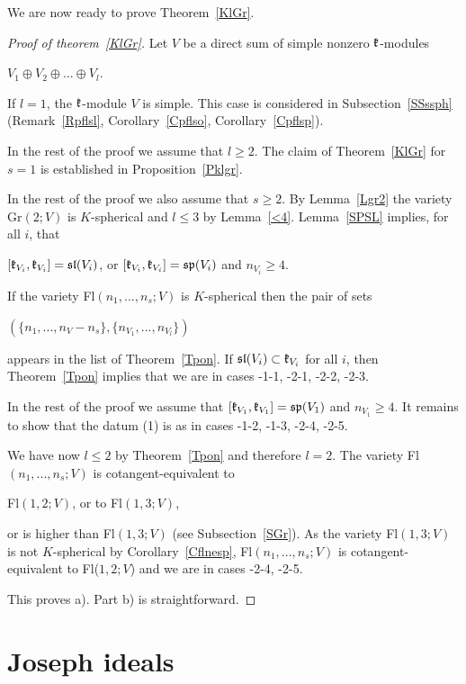 \documentclass[12pt]{amsart}
\theoremstyle{definition}\newtheorem{theorem}{Theorem}[section]
\theoremstyle{definition}\newtheorem{definition}[proposition]{Definition}
\theoremstyle{remark}\newtheorem{example}[proposition]{Example}
\newcounter{AP}
\begin{document}
We are now ready to prove Theorem~\ref{KlGr}.
\begin{proof}[Proof of theorem~\ref{KlGr}]Let $V$ be a direct sum of simple nonzero $\frak k$-modules \begin{center}$V_1\oplus V_2\oplus... \oplus V_l$.\end{center} If $l=1$, the $\frak k$-module $V$ is simple. This case is considered in Subsection~\ref{SSssph} (Remark~\ref{Rpflsl}, Corollary~\ref{Cpflso}, Corollary~\ref{Cpflsp}).

In the rest of the proof we assume that $l\ge 2$. The claim of Theorem~\ref{KlGr} for $s=1$ is established in Proposition~\ref{Pklgr}.

In the rest of the proof we also assume that $s\ge 2$. By Lemma~\ref{Lgr2} the variety Gr$(2; V)$ is $K$-spherical and $l\le 3$ by Lemma~\ref{<4}. Lemma~\ref{SPSL} implies, for all $i$, that\begin{center}$[\frak k_{V_i}, \frak k_{V_i}]=\frak{sl}(V_i)$, or $[\frak k_{V_i}, \frak k_{V_i}]=\frak{sp}(V_i)$ and $n_{V_i}\ge 4$.\end{center}

If the variety Fl$(n_1,...,n_s; V)$ is $K$-spherical then the pair of sets \begin{center}$(\{n_1,...,n_V-n_s\}, \{n_{V_1},..., n_{V_l}\})$\end{center} appears in the list of Theorem~\ref{Tpon}. If $\frak{sl}(V_i)\subset\frak k_{V_i}$ for all $i$, then Theorem~\ref{Tpon} implies that we are in cases \setcounter{AP}{2}-1-1, -2-1, -2-2, -2-3.

In the rest of the proof we assume that $[\frak k_{V_1}, \frak k_{V_1}]=\frak{sp}(V_1)$ and $n_{V_1}\ge 4$. It remains to show that the datum (1) is as in cases -1-2, -1-3, -2-4, -2-5.

We have now $l\le 2$ by Theorem~\ref{Tpon} and therefore $l=2$. The variety Fl$(n_1,..., n_s; V)$ is cotangent-equivalent to \begin{center}Fl$(1, 2; V)$, or to Fl$(1, 3; V)$,\end{center} or is higher than Fl$(1, 3; V)$ (see Subsection~\ref{SGr}). As the variety Fl$(1,3; V)$ is not $K$-spherical by Corollary~\ref{Cflnesp}, Fl$(n_1,..., n_s; V)$ is cotangent-equivalent to Fl($1,2; V$) and we are in cases -2-4, -2-5.

This proves a). Part b) is straightforward.\end{proof}
\newpage\section{Joseph ideals}\label{SJId}
\end{document}
